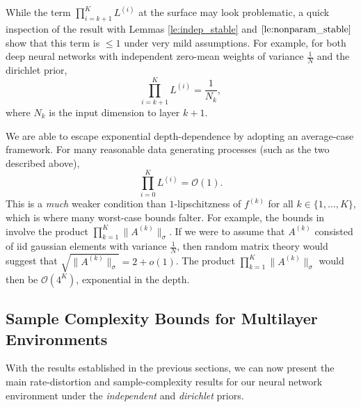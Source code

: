 \documentclass[twoside,11pt]{article}
\begin{document}
While the term $\prod_{i=k+1}^{K}L^{(i)}$ at the surface may look problematic, a quick inspection of the result with Lemmas \ref{le:indep_stable} and $\ref{le:nonparam_stable}$ show that this term is $\leq 1$ under very mild assumptions. For example, for both deep neural networks with independent zero-mean weights of variance $\frac{1}{N}$ and the dirichlet prior, $$\prod_{i=k+1}^{K}L^{(i)} = \frac{1}{N_{k}},$$ 
where $N_{k}$ is the input dimension to layer $k+1$.

We are able to escape exponential depth-dependence by adopting an average-case framework. For many reasonable data generating processes (such as the two described above),
$$\prod_{i=0}^{K} L^{(i)} = \mathcal{O}(1).$$
This is a \emph{much} weaker condition than $1$-lipschitzness of $f^{(k)}$ for all $k\in \{1, \ldots, K\}$, which is where many worst-case bounds falter. For example, the bounds in \cite{bartlett2017spectrally} involve the product $\prod_{k=1}^{K}\|A^{(k)}\|_\sigma$. If we were to assume that $A^{(k)}$ consisted of iid gaussian elements with variance $\frac{1}{N}$, then random matrix theory \citep{https://doi.org/10.48550/arxiv.1011.3027} would suggest that $\sqrt{\|A^{(k)}\|_\sigma} = 2 + o(1)$. The product $\prod_{k=1}^{K}\|A^{(k)}\|_\sigma$ would then be $\mathcal{O}(4^K)$, exponential in the depth.

\subsection{Sample Complexity Bounds for Multilayer Environments}
With the results established in the previous sections, we can now present the main rate-distortion and sample-complexity results for our neural network environment under the \emph{independent} and \emph{dirichlet} priors.
\end{document}
